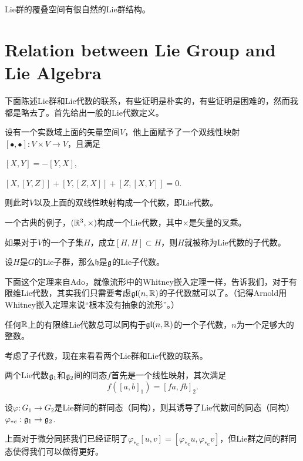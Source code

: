 \para Lie群的覆叠空间有很自然的Lie群结构。

\section{Relation between Lie Group and Lie Algebra}

下面陈述Lie群和Lie代数的联系，有些证明是朴实的，有些证明是困难的，然而我都是略去了。首先给出一般的Lie代数定义。

\para 设有一个实数域上面的矢量空间$V$，他上面赋予了一个双线性映射$[\bullet,\bullet]:V\times V\to V$，且满足

 $[X,Y]=-[Y,X]$,

 $[X,[Y,Z]]+[Y,[Z,X]]+[Z,[X,Y]]=0$.

则此时$V$以及上面的双线性映射构成一个代数，即Lie代数。

一个古典的例子，$(\mathbb{R}^3,\times)$构成一个Lie代数，其中$\times$是矢量的叉乘。

\para 如果对于$V$的一个子集$H$，成立$[H,H]\subset H$，则$H$就被称为Lie代数的子代数。

\theo 设$H$是$G$的Lie子群，那么$\mathfrak{h}$是${\mathfrak{g}}$的Lie子代数。

下面这个定理来自Ado，就像流形中的Whitney嵌入定理一样，告诉我们，对于有限维Lie代数，其实我们只需要考虑$\mathfrak{gl}(n,\mathbb{R})$的子代数就可以了。（记得Arnold用Whitney嵌入定理来说“根本没有抽象的流形”。）

\theo 任何$\mathbb{R}$上的有限维Lie代数总可以同构于$\mathfrak{gl}(n,\mathbb{R})$的一个子代数，$n$为一个足够大的整数。

考虑了子代数，现在来看看两个Lie群和Lie代数的联系。

\para 两个Lie代数${\mathfrak{g}}_1$和${\mathfrak{g}}_2$间的同态$f$首先是一个线性映射，其次满足
\[
f([a,b]_1)=[fa,fb]_2.
\]

\pro 设$\varphi:G_1\to G_2$是Lie群间的群同态（同构），则其诱导了Lie代数间的同态（同构）$\varphi_{*e}:{\mathfrak{g}}_1\to {\mathfrak{g}}_2$.

上面对于微分同胚我们已经证明了$\varphi_{*e}[u,v]=[\varphi_{*e}u,\varphi_{*e}v]$，但Lie群之间的群同态使得我们可以做得更好。

